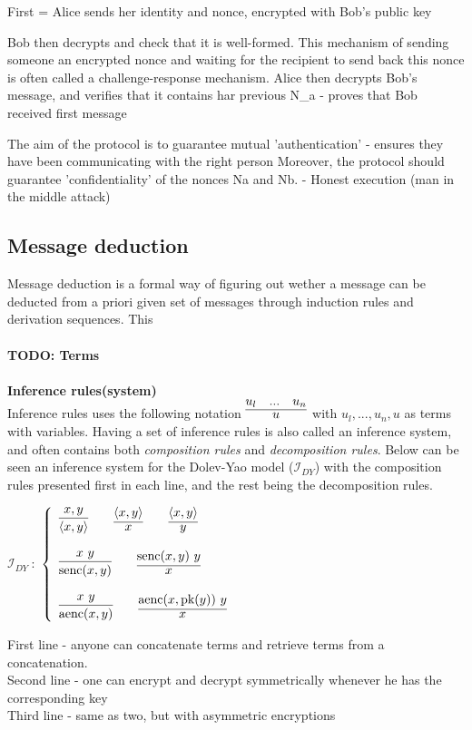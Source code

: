First 					= Alice sends her identity and nonce, encrypted with Bob's public key

Bob then decrypts and check that it is well-formed.
This mechanism of sending someone an encrypted nonce and waiting for the recipient to send back this nonce is often called a challenge-response mechanism.
Alice then decrypts Bob's message, and verifies that it contains har previous N_a - proves that Bob received first message

The aim of the protocol is to guarantee mutual 'authentication' - ensures they have been communicating with the right person
Moreover, the protocol should guarantee 'confidentiality' of the nonces Na and Nb.
 - Honest execution (man in the middle attack)
\fi

\subsection{Message deduction}
Message deduction is a formal way of figuring out wether a message can be deducted from a priori given set of messages through induction rules and derivation sequences. This \\ \\
\textbf{TODO: Terms} \\ \\
\textbf{Inference rules(system)} \\
Inference rules uses the following notation $\infer{u} {u_l & ... & u_n}$ with $u_l,...,u_n, u$ as terms with variables. Having a set of inference rules is also called an inference system, and often contains both \textit{composition rules} and \textit{decomposition rules}. Below can be seen an inference system for the Dolev-Yao model ($\mathcal{I}_{DY}$) with the composition rules presented first in each line, and the rest being the decomposition rules. 
\begin{center}
$\mathcal{I}_{DY}\ :$
\begin{math}
  \left\{
    \begin{array}{l l l}
      \infer{\langle x, y \rangle}{x,y} \qquad \infer{x}{\langle x, y \rangle} \qquad \infer{y}{\langle x, y \rangle} \\ \\
      \infer{\text{senc}(x, y)}{x\ y} \qquad  \infer{x}{\text{senc}(x, y)\ y} \\ \\
      \infer{\text{aenc}(x, y)}{x\ y} \qquad \infer{x}{\text{aenc}(x, \text{pk}(y))\ y}
    \end{array}
  \right.
\end{math}
\end{center}
\bigbreak
\noindent First line - anyone can concatenate terms and retrieve terms from a concatenation. \\
Second line - one can encrypt and decrypt symmetrically whenever he has the corresponding key \\
Third line - same as two, but with asymmetric encryptions 

